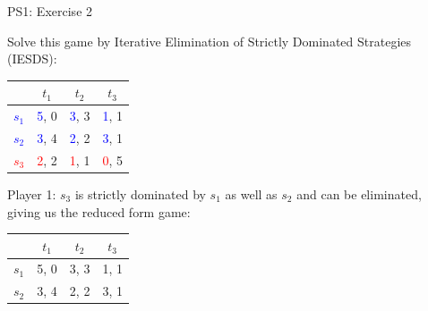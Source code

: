 \begin{frame}{PS1: Exercise 2}
\begin{multicols}{2}
Solve this game by Iterative Elimination of Strictly Dominated Strategies (IESDS):
\begin{table}
  \begin{tabular}{c|c|c|c}
          & $t_1$ & $t_2$ & $t_3$ \\
    \midrule
    \textcolor{blue}{$s_1$} & \textcolor{blue}{5}, 0  & \textcolor{blue}{3}, 3  & \textcolor{blue}{1}, 1 \\
    \midrule
    \textcolor{blue}{$s_2$} & \textcolor{blue}{3}, 4  & \textcolor{blue}{2}, 2  & \textcolor{blue}{3}, 1 \\
    \midrule
    \textcolor{red}{$s_3$} & \textcolor{red}{2}, 2  & \textcolor{red}{1}, 1  & \textcolor{red}{0}, 5
  \end{tabular}
\end{table}
Player 1: $s_3$ is strictly dominated by $s_1$ as well as $s_2$ and can be eliminated, giving us the reduced form game:
\begin{table}
  \begin{tabular}{c|c|c|c}
          & $t_1$ & $t_2$ & $t_3$ \\
    \midrule
    $s_1$ & 5, 0  & 3, 3  & 1, 1 \\
    \midrule
    $s_2$ & 3, 4  & 2, 2  & 3, 1
  \end{tabular}
\end{table}
\vfill\null
\columnbreak
\vfill\null
\end{multicols}
\end{frame}


